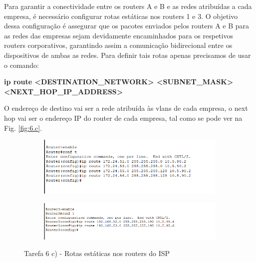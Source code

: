 \documentclass[11pt,english, openright, oneside]{book}
\begin{document}
Para garantir a conectividade entre os routers A e B e as redes atribuídas a cada empresa, é necessário configurar rotas estáticas nos routers 1 e 3. O objetivo dessa configuração é assegurar que os pacotes enviados pelos routers A e B para as redes das empresas sejam devidamente encaminhados para os respetivos routers corporativos, garantindo assim a comunicação bidirecional entre os dispositivos de ambas as redes.
Para definir tais rotas apenas precisamos de usar o comando: \par \vspace{0.2cm}
\small{\textbf{ip route <DESTINATION\_NETWORK> <SUBNET\_MASK><NEXT\_HOP\_IP\_ADDRESS>}}
\par \vspace{0.2cm}
O endereço de destino vai ser a rede atribuída às vlans de cada empresa, o next hop vai ser o endereço IP do router de cada empresa, tal como se pode ver na Fig. \ref{fig:6.c}.
\par \vspace{0.2cm}

\begin{figure}[h]
    \centering
    \begin{subfigure}{.5\textwidth}
        \centering
        \includegraphics[width=0.99\linewidth]{imagens/Tarefa6/6.c_Router1.png}
    \end{subfigure}%
    \begin{subfigure}{.5\textwidth}
        \centering
        \includegraphics[width=0.99\linewidth]{imagens/Tarefa6/6.c_Router3.png}
    \end{subfigure}
    \caption{Tarefa 6 c) - Rotas estáticas nos routers do ISP}
    \label{fig:6.a}
\end{figure}
\vspace{0.2cm}
\end{document}
